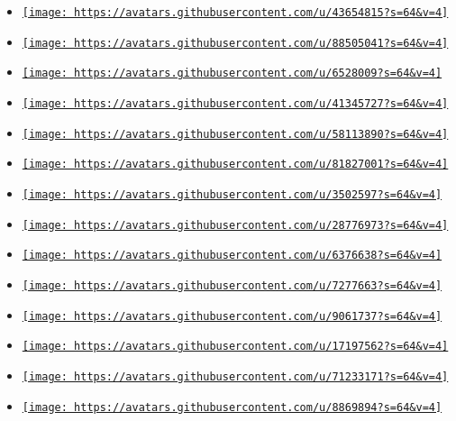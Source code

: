 \begin{itemize}
\item
  \href{https://github.com/istudyatuni}{\texttt{[image: https://avatars.githubusercontent.com/u/43654815?s=64\&v=4]}}
\item
  \href{https://github.com/jaroeichler}{\texttt{[image: https://avatars.githubusercontent.com/u/88505041?s=64\&v=4]}}
\item
  \href{https://github.com/jbirnick}{\texttt{[image: https://avatars.githubusercontent.com/u/6528009?s=64\&v=4]}}
\item
  \href{https://github.com/kg583}{\texttt{[image: https://avatars.githubusercontent.com/u/41345727?s=64\&v=4]}}
\item
  \href{https://github.com/mattfbacon}{\texttt{[image: https://avatars.githubusercontent.com/u/58113890?s=64\&v=4]}}
\item
  \href{https://github.com/max397574}{\texttt{[image: https://avatars.githubusercontent.com/u/81827001?s=64\&v=4]}}
\item
  \href{https://github.com/mkpoli}{\texttt{[image: https://avatars.githubusercontent.com/u/3502597?s=64\&v=4]}}
\item
  \href{https://github.com/mkroening}{\texttt{[image: https://avatars.githubusercontent.com/u/28776973?s=64\&v=4]}}
\item
  \href{https://github.com/muzimuzhi}{\texttt{[image: https://avatars.githubusercontent.com/u/6376638?s=64\&v=4]}}
\item
  \href{https://github.com/nathaniel-brough}{\texttt{[image: https://avatars.githubusercontent.com/u/7277663?s=64\&v=4]}}
\item
  \href{https://github.com/natsukagami}{\texttt{[image: https://avatars.githubusercontent.com/u/9061737?s=64\&v=4]}}
\item
  \href{https://github.com/nvarner}{\texttt{[image: https://avatars.githubusercontent.com/u/17197562?s=64\&v=4]}}
\item
  \href{https://github.com/onerandomusername}{\texttt{[image: https://avatars.githubusercontent.com/u/71233171?s=64\&v=4]}}
\item
  \href{https://github.com/pineapplehunter}{\texttt{[image: https://avatars.githubusercontent.com/u/8869894?s=64\&v=4]}}

\end{itemize}
